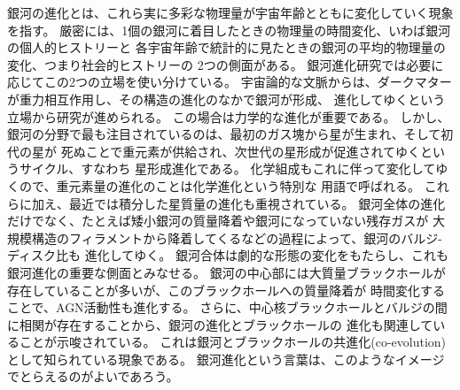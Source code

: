銀河の進化とは、これら実に多彩な物理量が宇宙年齢とともに変化していく現象を指す。
厳密には、1個の銀河に着目したときの物理量の時間変化、いわば銀河の個人的ヒストリーと
各宇宙年齢で統計的に見たときの銀河の平均的物理量の変化、つまり社会的ヒストリーの
2つの側面がある。
銀河進化研究では必要に応じてこの2つの立場を使い分けている。
宇宙論的な文脈からは、ダークマターが重力相互作用し、その構造の進化のなかで銀河が形成、
進化してゆくという立場から研究が進められる。
この場合は力学的な進化が重要である。
しかし、銀河の分野で最も注目されているのは、最初のガス塊から星が生まれ、そして初代の星が
死ぬことで重元素が供給され、次世代の星形成が促進されてゆくというサイクル、すなわち
星形成進化である。
化学組成もこれに伴って変化してゆくので、重元素量の進化のことは化学進化という特別な
用語で呼ばれる\citep{tinsley1980}。
これらに加え、最近では積分した星質量の進化も重視されている。
銀河全体の進化だけでなく、たとえば矮小銀河の質量降着や銀河になっていない残存ガスが
大規模構造のフィラメントから降着してくるなどの過程によって、銀河のバルジ-ディスク比も
進化してゆく。
銀河合体は劇的な形態の変化をもたらし、これも銀河進化の重要な側面とみなせる。
銀河の中心部には大質量ブラックホールが存在していることが多いが、このブラックホールへの質量降着が
時間変化することで、AGN活動性も進化する。
さらに、中心核ブラックホールとバルジの間に相関が存在することから、銀河の進化とブラックホールの
進化も関連していることが示唆されている\citep[e.g.][]{magorrian1998}。
これは銀河とブラックホールの共進化(co-evolution)として知られている現象である。
銀河進化という言葉は、このようなイメージでとらえるのがよいであろう。


